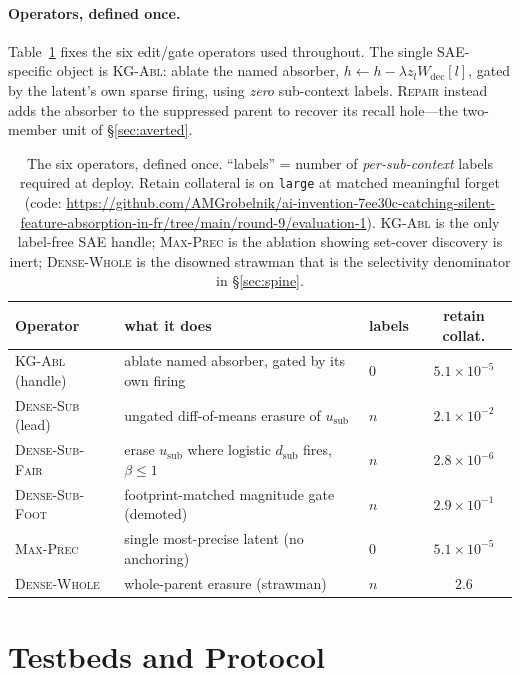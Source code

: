 \documentclass[11pt,letterpaper]{article}
\begin{document}
\paragraph{Operators, defined once.} Table~\ref{tab:ops} fixes the six edit/gate operators used throughout. The single SAE-specific object is \textsc{KG-Abl}: ablate the named absorber, $h\leftarrow h-\lambda z_l W_{\text{dec}}[l]$, gated by the latent's own sparse firing, using \emph{zero} sub-context labels. \textsc{Repair} instead adds the absorber to the suppressed parent to recover its recall hole---the two-member unit of \S\ref{sec:averted}.

\begin{table}[t]
\centering\small
\caption{The six operators, defined once. ``labels'' = number of \emph{per-sub-context} labels required at deploy. Retain collateral is on \texttt{large} at matched meaningful forget (code: \protect\url{https://github.com/AMGrobelnik/ai-invention-7ee30c-catching-silent-feature-absorption-in-fr/tree/main/round-9/evaluation-1}). \textsc{KG-Abl} is the only label-free SAE handle; \textsc{Max-Prec} is the ablation showing set-cover discovery is inert; \textsc{Dense-Whole} is the disowned strawman that is the selectivity denominator in \S\ref{sec:spine}.}
\label{tab:ops}
\begin{tabular}{lllc}
\toprule
Operator & what it does & labels & retain collat. \\
\midrule
\textsc{KG-Abl} (handle) & ablate named absorber, gated by its own firing & $0$ & $5.1\times10^{-5}$ \\
\textsc{Dense-Sub} (lead) & ungated diff-of-means erasure of $u_{\text{sub}}$ & $n$ & $2.1\times10^{-2}$ \\
\textsc{Dense-Sub-Fair} & erase $u_{\text{sub}}$ where logistic $d_{\text{sub}}$ fires, $\beta\le1$ & $n$ & $2.8\times10^{-6}$ \\
\textsc{Dense-Sub-Foot} & footprint-matched magnitude gate (demoted) & $n$ & $2.9\times10^{-1}$ \\
\textsc{Max-Prec} & single most-precise latent (no anchoring) & $0$ & $5.1\times10^{-5}$ \\
\textsc{Dense-Whole} & whole-parent erasure (strawman) & $n$ & $2.6$ \\
\bottomrule
\end{tabular}
\end{table}

\section{Testbeds and Protocol}
\label{sec:setup}
\end{document}
